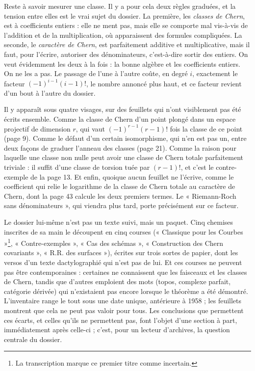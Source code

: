 \documentclass[11pt,a4paper]{article}
\begin{document}
\begin{resume}
Reste à savoir mesurer une classe. Il y a pour cela deux règles graduées, et la
tension entre elles est le vrai sujet du dossier. La première, les
\emph{classes de Chern}, est à coefficients entiers : elle ne ment pas, mais
elle se comporte mal vis-à-vis de l'addition et de la multiplication, où
apparaissent des formules compliquées. La seconde, le \emph{caractère de
Chern}, est parfaitement additive et multiplicative, mais il faut, pour
l'écrire, autoriser des dénominateurs, c'est-à-dire sortir des entiers. On veut
évidemment les deux à la fois : la bonne algèbre et les coefficients entiers.
On ne les a pas. Le passage de l'une à l'autre coûte, en degré $i$, exactement
le facteur $(-1)^{i-1}(i-1)!$, le nombre annoncé plus haut, et ce facteur
revient d'un bout à l'autre du dossier.

Il y apparaît sous quatre visages, sur des feuillets qui n'ont visiblement pas
été écrits ensemble. Comme la classe de Chern d'un point plongé dans un espace
projectif de dimension $r$, qui vaut $(-1)^{r-1}(r-1)!$ fois la classe de ce
point (page 9). Comme le défaut d'un certain isomorphisme, qui n'en est pas un,
entre deux façons de graduer l'anneau des classes (page 21). Comme la raison
pour laquelle une classe non nulle peut avoir une classe de Chern totale
parfaitement triviale : il suffit d'une classe de torsion tuée par $(r-1)!$,
et c'est le contre-exemple de la page 13. Et enfin, quoique aucun feuillet ne
l'écrive, comme le coefficient qui relie le logarithme de la classe de Chern
totale au caractère de Chern, dont la page 43 calcule les deux premiers termes.
Le « Riemann-Roch sans dénominateurs », qui viendra plus tard, porte
précisément sur ce facteur.

Le dossier lui-même n'est pas un texte suivi, mais un paquet. Cinq chemises
inscrites de sa main le découpent en cinq courses (« Classique pour les
Courbes »\footnote{La transcription marque ce premier titre comme
incertain.}, « Contre-exemples », « Cas des schémas », « Construction des Chern
covariants », « R.R. des surfaces »), écrites sur trois sortes de papier,
dont les versos d'un texte dactylographié qui n'est pas de lui. Et ces courses
ne peuvent pas être contemporaines : certaines ne connaissent que les faisceaux
et les classes de Chern, tandis que d'autres emploient des mots (topos,
complexe parfait, catégorie dérivée) qui n'existaient pas encore lorsque le
théorème a été démontré. L'inventaire range le tout sous une date unique,
antérieure à 1958 ; les feuillets montrent que cela ne peut pas valoir pour
tous. Les conclusions que permettent ces écarts, et celles qu'ils ne
permettent pas, font l'objet d'une section à part, immédiatement après celle-ci ;
c'est, pour un lecteur d'archives, la question centrale du dossier.


\end{resume}
\end{document}
